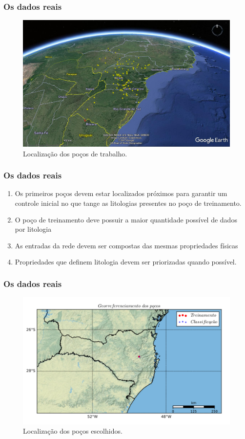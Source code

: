 \documentclass[aspectratio=10]{beamer} %
\begin{document}
\begin{frame}
	\frametitle{Os dados reais}
	\begin{figure}[H]
		\centering
		\includegraphics[scale=0.25]{Imagens/Pocos2.png}
		\caption{Localização dos poços de trabalho.}
		\label{real}
	\end{figure}
\end{frame}

\begin{frame}
	\frametitle{Os dados reais}
	\begin{enumerate}
		\item Os primeiros poços devem estar localizados próximos para garantir um controle inicial no que tange as litologias presentes no poço de treinamento. 
		\pause
		\item O poço de treinamento deve possuir a maior quantidade possível de dados por litologia
		\pause
		\item As entradas da rede devem ser compostas das mesmas propriedades físicas
		\pause
		\item Propriedades que definem litologia devem ser priorizadas quando possível.
	\end{enumerate}
\end{frame}

\begin{frame}
	\frametitle{Os dados reais}
	\begin{figure}[H]
		\centering
		\includegraphics[scale=0.5]{Imagens/locmap02.pdf}
		\caption{Localização dos poços escolhidos.}
		\label{loc02}
	\end{figure}
\end{frame}
\end{document}
